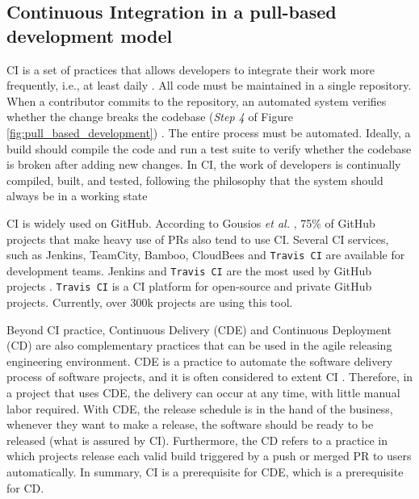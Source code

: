\subsection{\textbf{Continuous Integration in a pull-based development model}}
\label{subsec:pull_based_with_ci}

CI is a set of practices that allows developers to integrate their work more frequently, i.e., at least daily \citep{Fowler2006-zc,Meyer2014-px}. All code must be maintained in a single repository. When a contributor commits to the repository, an automated system verifies whether the change breaks the codebase (\textit{Step 4} of Figure \ref{fig:pull_based_development}) \citep{Meyer2014-px}. The entire process must be automated. Ideally, a build should compile the code and run a test suite to verify whether the codebase is broken after adding new changes. In CI, the work of developers is continually
compiled, built, and tested, following the philosophy that the system should always be in a working state~\citep{Yu2016-cy,Duvall2007-tb}

CI is widely used on GitHub. According to Gousios \textit{et al.} \citep{Gousios2015-ui}, 75\% of GitHub projects that make heavy use of PRs also tend to use CI. Several CI services, such as Jenkins, TeamCity, Bamboo, CloudBees and \texttt{Travis CI} \citep{Meyer2014-px} are available for development teams.  Jenkins and \texttt{Travis CI} are the most used by GitHub projects \citep{Vasilescu2015-tn}. \texttt{Travis CI} is a CI platform for open-source and private GitHub projects. Currently, over 300k projects are using this tool.

Beyond CI practice, Continuous Delivery (CDE) and Continuous Deployment (CD) are also complementary practices that can be used in the agile releasing engineering environment. CDE is a practice to automate the software delivery process of software projects, and it is often considered to extent CI \citep{Karvonen201787}. Therefore, in a project that uses CDE, the delivery can occur at any time, with little manual labor required. With CDE, the release schedule is in the hand of the business, whenever they want to make a release, the software should be ready to be released (what is assured by CI). Furthermore, the CD refers to a practice in which projects release each valid build triggered by a push or merged PR to users automatically. In summary, CI is a prerequisite for CDE, which is a prerequisite for CD.